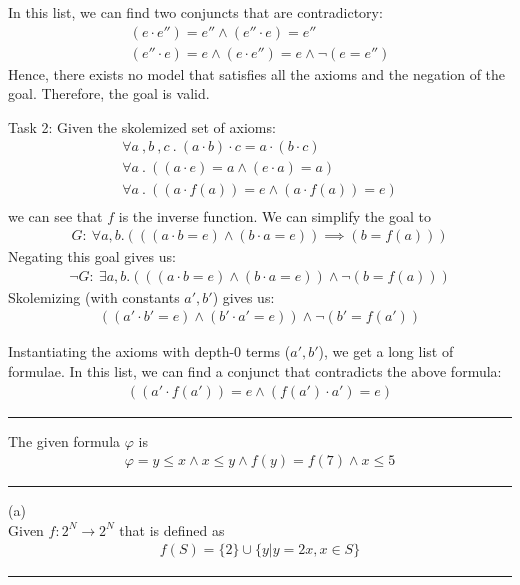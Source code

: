\documentclass[12pt,letterpaper, onecolumn]{exam}
\begin{document}
\begin{questions}
	In this list,
	we can find two conjuncts that are contradictory:
	\begin{align*}
		(e \cdot e'') = e'' \land (e'' \cdot e) = e'' \\
		(e'' \cdot e) = e \land (e \cdot e'') = e \land \neg (e = e'')
	\end{align*}
	Hence, there exists no model that satisfies all the axioms and the negation of the goal. Therefore, the goal is valid.
	

	Task 2:
	Given the skolemized set of axioms:
	\begin{align*}
		\forall a \:, b \:, c \:.\: (a \cdot b) \cdot c = a \cdot (b \cdot c) \\
		\forall a \:.\: ((a \cdot e) = a \land (e \cdot a) = a) \\
		\forall a \:.\: ((a \cdot f(a)) = e \land (a \cdot f(a)) = e) \\
	\end{align*}
	we can see that $f$ is the inverse function. We can simplify the goal to 
	\begin{align*}
		G : \: \forall a, b . (((a \cdot b = e) \land (b \cdot a = e)) \implies (b = f(a)) )
	\end{align*}
	Negating this goal gives us:
	\begin{align*}
		\neg G : \: \exists a, b . (((a \cdot b = e) \land (b \cdot a = e)) \land \neg(b = f(a)))
	\end{align*}
	Skolemizing (with constants $a', b'$) gives us:
	\begin{align*}
		((a' \cdot b' = e) \land (b' \cdot a' = e)) \land \neg(b' = f(a'))
	\end{align*}

	Instantiating the axioms with depth-0 terms ($a', b'$), we get a long list of formulae. In this list,
	we can find a conjunct that contradicts the above formula:
	\begin{align*}
		((a' \cdot f(a')) = e \land (f(a') \cdot a') = e)
	\end{align*}



	

    {\rule{17cm}{0.4pt}}

	\question[]
	\solutiontitle

	The given formula $ \varphi $ is
	\begin{align*}
		\varphi = y \le x \land x \le y \land f(y) = f(7) \land x \le 5
	\end{align*}


    {\rule{17cm}{0.4pt}}

	\question[]
	\solutiontitle

	(a) \\
	Given $ f: 2^{N} \rightarrow 2^{N} $ that is defined as 
	\begin{align*}
		f(S) = \{2\} \cup \{y | y = 2x, x \in S\}
	\end{align*}


    {\rule{17cm}{0.4pt}}

\end{questions}
\end{document}
